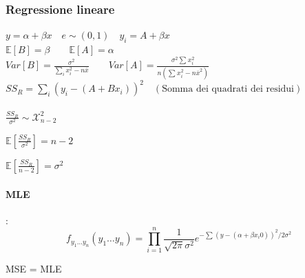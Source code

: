 \documentclass[]{article}
\newcommand{\ev}{\mathbb{E}[X]}
\renewcommand{\ev}[1]{\mathbb{E}\left[#1\right]}
\begin{document}
    \subsubsection{Regressione lineare}
    $y = \alpha + \beta x \quad e \sim(0,1) \quad y_i = A + \beta x$ \\[4ex]
    $\ev{B} = \beta \qquad \ev{A} = \alpha$ \\
    $Var[B] = \frac{\sigma^2}{\sum_{i}^{}x^2_i - n\overline{x}} \qquad Var[A] = \frac{\sigma^2 \sum_{}^{} x^2_i}{n(\sum_{}^{} x^2_i - n\overline{x}^2)}$ \\[4ex]
    $SS_R = \sum_{i}^{} (y_i - (A+B x_i))^2 \quad (\text{Somma dei quadrati dei residui})$ \\\\
    $\frac{SS_R}{\sigma^2} \sim \mathcal{X}^2_{n-2}$ \\[4ex]
    \begin{minipage}{0.45\textwidth}
        $\ev{\frac{SS_R}{\sigma^2}} = n-2$
    \end{minipage}
    \begin{minipage}{0.45\textwidth}
        $\ev{\frac{SS_R}{n-2}} = \sigma^2$
    \end{minipage}
    \paragraph{MLE}: \\
    \[ f_{y_1 \ldots y_n} (y_1 \ldots y_n) = \prod_{i= 1}^{n} \frac{1}{\sqrt{2 \pi} \sigma^2} e^{-\sum_{}^{} (y-(\alpha + \beta x_i0))^2 / 2\sigma^2} \]
    \centerline{MSE = MLE}
\end{document}
